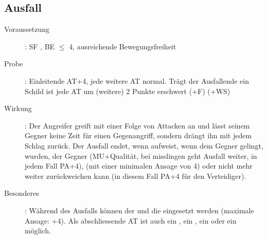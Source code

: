 \subsection{Ausfall}
\label{aktion.ausfall}
\begin{description}
    \item[Voraussetzung]:
        SF , BE \textrm{${\leq}$} 4, ausreichende Bewegungsfreiheit
    \item[Probe]:
        Einleitende AT+4, jede weitere AT normal.
        Trägt der Ausfallende ein Schild ist jede AT um (weitere) 2 Punkte erschwert (+F) (+WS)
    \item[Wirkung]:
        Der Angreifer greift mit einer Folge von Attacken an und lässt seinem Gegner keine Zeit für einen Gegenangriff, sondern drängt ihn mit jedem Schlag zurück.
        Der Ausfall endet, wenn  aufweist, wenn dem Gegner  gelingt,  wurden, der Gegner  (MU+Qualität, bei misslingen geht Ausfall weiter, in jedem Fall PA+4),  (mit einer minimalen Ansage von 4) oder nicht mehr weiter zurückweichen kann (in diesem Fall PA+4 für den Verteidiger).
    \item[Besonderes]:
        Während des Ausfalls können der  und die  eingesetzt werden (maximale Ansage: +4).
        Als abschliessende AT ist auch ein , ein , ein  oder ein  möglich.
\end{description}
